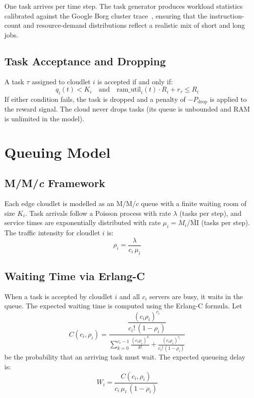 One task arrives per time step. The task generator produces
workload statistics calibrated against the Google Borg cluster
trace~\cite{reiss2011google}, ensuring that the instruction-count
and resource-demand distributions reflect a realistic mix of
short and long jobs.

\subsection{Task Acceptance and Dropping}

A task $\tau$ assigned to cloudlet $i$ is accepted if and only if:
\begin{equation}
  q_i(t) < K_i \quad \text{and} \quad
  \text{ram\_util}_i(t) \cdot R_i + r_{\tau} \leq R_i
  \label{eq:accept_condition}
\end{equation}
If either condition fails, the task is dropped and a penalty of
$-P_{\text{drop}}$ is applied to the reward signal. The cloud
never drops tasks (its queue is unbounded and RAM is unlimited in
the model).

\section{Queuing Model}
\label{sec:queue_model}

\subsection{M/M/\textit{c} Framework}

Each edge cloudlet is modelled as an M/M/$c$ queue with a finite
waiting room of size $K_i$. Task arrivals follow a Poisson process
with rate $\lambda$ (tasks per step), and service times are
exponentially distributed with rate $\mu_i = M_i / \bar{\text{MI}}$
(tasks per step). The traffic intensity for cloudlet $i$ is:
\begin{equation}
  \rho_i = \frac{\lambda}{c_i \, \mu_i}
  \label{eq:traffic_intensity}
\end{equation}

\subsection{Waiting Time via Erlang-C}

When a task is accepted by cloudlet $i$ and all $c_i$ servers are
busy, it waits in the queue. The expected waiting time is
computed using the Erlang-C formula. Let
\begin{equation}
  C(c_i, \rho_i) =
  \frac{ \dfrac{(c_i \rho_i)^{c_i}}{c_i!\,(1-\rho_i)} }
       { \displaystyle\sum_{k=0}^{c_i-1}
         \frac{(c_i \rho_i)^k}{k!}
         + \frac{(c_i \rho_i)^{c_i}}{c_i!\,(1-\rho_i)} }
  \label{eq:erlang_c}
\end{equation}
be the probability that an arriving task must wait. The expected
queueing delay is:
\begin{equation}
  W_i = \frac{C(c_i, \rho_i)}{c_i \, \mu_i \,(1 - \rho_i)}
  \label{eq:queue_delay}
\end{equation}

